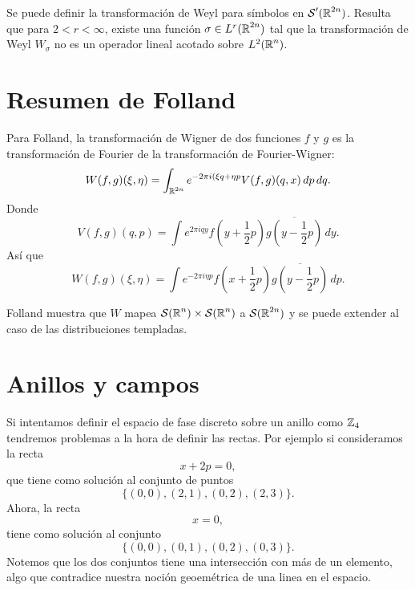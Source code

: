   Se puede definir la transformación de Weyl para símbolos
  en $\operatorname{\mathcal S}'(\operatorname{\mathbb{R}}^{2n})$. Resulta que para $2 < r < \infty$,
  existe una función $\sigma \in L^{r}(\operatorname{\mathbb{R}}^{2n})$ tal que la
  transformación de Weyl $W_\sigma$ no es un operador lineal
  acotado sobre $L^2(\operatorname{\mathbb{R}}^{n})$.

  \section{Resumen de Folland}

  Para Folland, la transformación de Wigner de dos funciones
  $f$ y $g$ es la transformación de Fourier de la
  transformación de Fourier-Wigner:
  \[
    W(f,g)(\xi, \eta)
    = \int_{\operatorname{\mathbb{R}}^{2n}} e^{-2\pi i (\xi q + \eta p} V(f,g)(q,x)
    \, dp \, dq.
  \] 
  Donde
  \[
    V(f,g)(q,p)
    = \int e^{2\pi i q y} f(y + \frac{1}{2}p)\overline{g(y -
    \frac{1}{2}p)} \, dy.
  \] 
  Así que
  \[
    W(f,g)(\xi, \eta) = \int e^{-2\pi i \eta p }
    f(x+\frac{1}{2}p)\overline{g(y-\frac{1}{2}p)} \, dp.
  \] 

  Folland muestra que $W$ mapea $\operatorname{\mathcal S}(\operatorname{\mathbb{R}}^{n}) \times
  \operatorname{\mathcal S}(\operatorname{\mathbb{R}}^{n})$ a $\operatorname{\mathcal S}(\operatorname{\mathbb{R}}^{2n})$ y se puede extender al caso
  de las distribuciones templadas.

\section{Anillos y campos}

  Si intentamos definir el espacio de fase discreto sobre un
  anillo como $\operatorname{\mathbb{Z}}_4$ tendremos problemas a la hora de
  definir las rectas. Por ejemplo si consideramos la recta
  \[
    x + 2p = 0,
  \]
  que tiene como solución al conjunto de puntos
  \[
    \{(0,0), (2,1), (0,2), (2,3)\}.
  \] 
  Ahora, la recta 
  \[
    x = 0,
  \] 
  tiene como solución al conjunto
  \[
    \{(0,0), (0,1), (0,2), (0,3)\}.
  \] 
  Notemos que los dos conjuntos tiene una intersección con
  más de un elemento, algo que contradice nuestra noción
  geoemétrica de una linea en el espacio.


